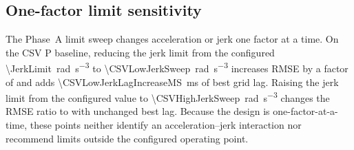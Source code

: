 \subsection{One-factor limit sensitivity}

The Phase~A limit sweep changes acceleration or jerk one factor at a time.
On the CSV P baseline, reducing the jerk limit from the configured
\SI{\JerkLimit}{\radian\per\second\cubed} to
\SI{\CSVLowJerkSweep}{\radian\per\second\cubed} increases RMSE by a factor of
\CSVLowJerkRMSEFactor{} and adds
\SI{\CSVLowJerkLagIncreaseMS}{\milli\second} of best grid lag.  Raising the jerk limit from the
configured value to
\SI{\CSVHighJerkSweep}{\radian\per\second\cubed} changes the RMSE ratio
to \CSVHighJerkRMSEFactor{} with unchanged best lag.  Because the design is one-factor-at-a-time,
these points neither identify an acceleration--jerk interaction nor recommend
limits outside the configured operating point.
